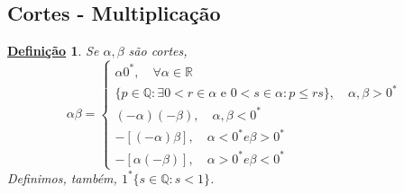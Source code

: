 \documentclass{article}
\newtheorem*{def*}{\underline{Defini\c c\~ao}}
\begin{document}
\subsection{Cortes - Multiplica\c c\~ao}
\begin{def*}
  Se $\alpha, \beta$ s\~ao cortes,
  $$
    \alpha\beta = \left\{\begin{array}{ll}
      \alpha0^*, \quad\forall \alpha\in \mathbb{R}\\
      \{p\in\mathbb{Q}: \exists0 < r\in\alpha \text{ e }0 < s\in\alpha: p \leq rs\},\quad \alpha, \beta > 0^*\\
      (-\alpha)(-\beta), \quad \alpha, \beta < 0^*\\
      -[(-\alpha)\beta], \quad \alpha < 0^* e \beta > 0^*\\
      -[\alpha(-\beta)], \quad \alpha > 0^* e \beta < 0^*
      \end{array}\right.
  $$
  Definimos, tamb\'em, $1^*\{s\in\mathbb{Q}: s < 1\}$.
\end{def*}
\newpage
\end{document}
